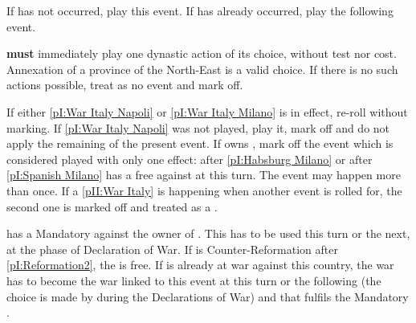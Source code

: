 \aparag If  has not occurred, play this event.
\aparag If  has already occurred, play the
following event.




\phevnt
\aparag \SPA \textbf{must} immediately play one dynastic action of its choice,
without test nor cost. Annexation of a province of the North-East is a valid
choice. If there is no such actions possible, treat as no event and mark off.





\aparag If either \ref{pI:War Italy Napoli} or \ref{pI:War Italy Milano} is in
effect, re-roll without marking.
\aparag If \ref{pI:War Italy Napoli} was not played, play it, mark off and do
not apply the remaining of the present event.
\aparag If \FRA owns \provinceLombardia, mark off the event which is
considered played with only one effect: \HAB after \ref{pI:Habsburg Milano} or
\SPA after \ref{pI:Spanish Milano} has a free \CB against \FRA at this turn.
\aparag The event may happen more than once. If a \ref{pII:War Italy} is
happening when another event is rolled for, the second one is marked off and
treated as a \RD.

\phevnt
\aparag \FRA has a Mandatory \CB against the owner of \provinceLombardia. This
\CB has to be used this turn or the next, at the phase of Declaration of
War. If \FRA is Counter-Reformation after \ref{pI:Reformation2}, the \CB is
free.
\aparag If \FRA is already at war against this country, the war has to become
the war linked to this event at this turn or the following (the choice is made
by \FRA during the Declarations of War) and that fulfils the Mandatory \CB.

